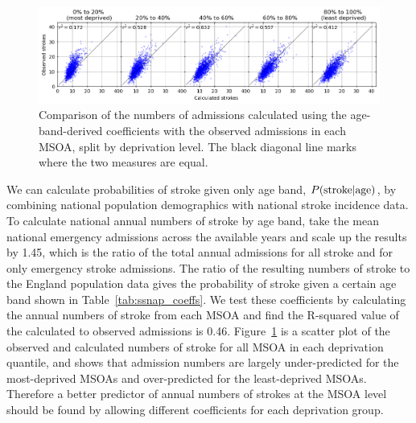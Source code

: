 \documentclass[12pt]{extarticle}
\begin{document}
\begin{figure}
    \centering
    \includegraphics[width=1.0\linewidth]{images/scatter_admissions_from_ssnap_coeffs_separate_1row.png}
    \caption{Comparison of the numbers of admissions calculated using the age-band-derived coefficients with the observed admissions in each MSOA, split by deprivation level. The black diagonal line marks where the two measures are equal.}
    \label{fig:scatter_admissions_from_ssnap_coeffs_separate}
\end{figure}

We can calculate probabilities of stroke given only age band, $P(\textnormal{stroke} | \textnormal{age})$, by combining national population demographics with national stroke incidence data.
To calculate national annual numbers of stroke by age band, take the mean national emergency admissions across the available years and scale up the results by 1.45, which is the ratio of the total annual admissions for all stroke and for only emergency stroke admissions.
% 
The ratio of the resulting numbers of stroke to the England population data gives the probability of stroke given a certain age band shown in Table~\ref{tab:ssnap_coeffs}.
% 
We test these coefficients by calculating the annual numbers of stroke from each MSOA and find the R-squared value of the calculated to observed admissions is 0.46. 
% 
Figure~\ref{fig:scatter_admissions_from_ssnap_coeffs_separate} is a scatter plot of the observed and calculated numbers of stroke for all MSOA in each deprivation quantile, and shows that admission numbers are largely under-predicted for the most-deprived MSOAs and over-predicted for the least-deprived MSOAs.
% 
Therefore a better predictor of annual numbers of strokes at the MSOA level should be found
by allowing different coefficients for each deprivation group.
\end{document}
